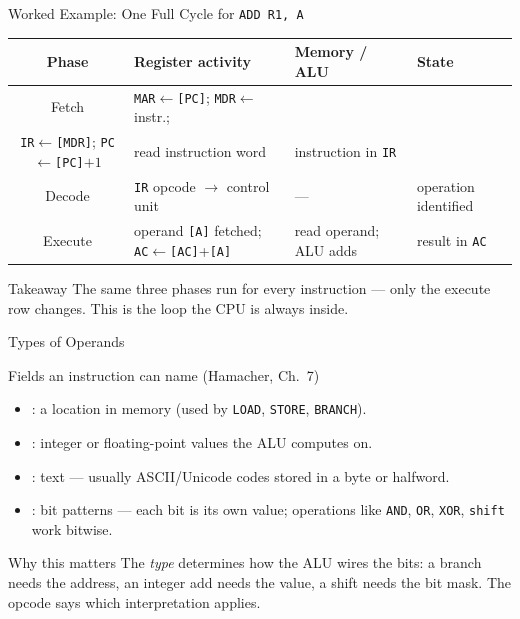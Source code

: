 \documentclass[aspectratio=169]{beamer}
\begin{document}
\begin{frame}{Worked Example: One Full Cycle for \texttt{ADD R1, A}}
  \footnotesize
  \begin{tabular}{@{}cp{3.4cm}p{3.6cm}p{3.4cm}@{}}
    \toprule
    \textbf{Phase} & \textbf{Register activity} & \textbf{Memory / ALU} & \textbf{State} \\
    \midrule
    Fetch &
      \texttt{MAR}$\gets$\texttt{[PC]}; \texttt{MDR}$\gets$instr.; \\
      \texttt{IR}$\gets$\texttt{[MDR]}; \texttt{PC}$\gets$\texttt{[PC]}$+1$ &
      read instruction word &
      instruction in \texttt{IR} \\
    Decode &
      \texttt{IR} opcode $\to$ control unit &
      --- &
      operation identified \\
    Execute &
      operand \texttt{[A]} fetched; \texttt{AC}$\gets$\texttt{[AC]}+\texttt{[A]} &
      read operand; ALU adds &
      result in \texttt{AC} \\
    \bottomrule
  \end{tabular}
  \vspace{0.3cm}
  \begin{alertblock}{Takeaway}
    The same three phases run for every instruction --- only the execute row
    changes. This is the loop the CPU is always inside.
  \end{alertblock}
\end{frame}

\begin{frame}{Types of Operands}
  \begin{block}{Fields an instruction can name (Hamacher, Ch.~7) \cite{Hamacher2002_computer_organization}}
    \begin{itemize}
      \item {}: a location in memory (used by \texttt{LOAD},
        \texttt{STORE}, \texttt{BRANCH}).
      \item {}: integer or floating-point values the ALU computes on.
      \item {}: text --- usually ASCII/Unicode codes stored in a
        byte or halfword.
      \item {}: bit patterns --- each bit is its own value;
        operations like \texttt{AND}, \texttt{OR}, \texttt{XOR}, \texttt{shift}
        work bitwise.
    \end{itemize}
  \end{block}
  \begin{exampleblock}{Why this matters}
    The \emph{type} determines how the ALU wires the bits: a branch needs the
    address, an integer add needs the value, a shift needs the bit mask. The
    opcode says which interpretation applies.
  \end{exampleblock}
\end{frame}
\end{document}
